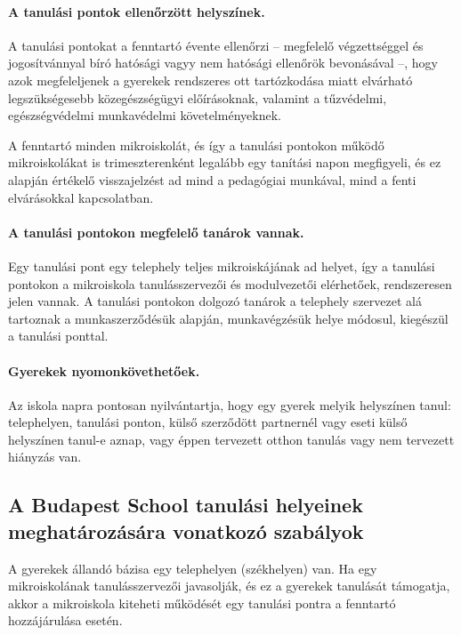 \paragraph{A tanulási pontok ellenőrzött helyszínek.}

A tanulási pontokat a fenntartó évente ellenőrzi -- megfelelő végzettséggel és jogosítvánnyal bíró hatósági vagyy nem hatósági ellenőrök bevonásával --, hogy azok megfeleljenek a gyerekek rendszeres ott tartózkodása miatt elvárható legszükségesebb közegészségügyi előírásoknak, valamint a tűzvédelmi, egészségvédelmi  munkavédelmi követelményeknek.

A fenntartó minden mikroiskolát, és így a tanulási pontokon működő mikroiskolákat is trimeszterenként legalább egy tanítási napon megfigyeli, és ez alapján értékelő visszajelzést ad mind a pedagógiai munkával, mind a fenti elvárásokkal kapcsolatban.

\paragraph{A tanulási pontokon megfelelő tanárok vannak.}

Egy tanulási pont egy telephely teljes mikroiskájának ad helyet, így a tanulási pontokon a mikroiskola tanulásszervezői és modulvezetői elérhetőek, rendszeresen jelen vannak. A tanulási pontokon dolgozó tanárok a telephely szervezet alá tartoznak a munkaszerződésük alapján, munkavégzésük helye módosul, kiegészül a tanulási ponttal.

\paragraph{Gyerekek nyomonkövethetőek.}

Az iskola napra pontosan nyilvántartja, hogy egy gyerek melyik helyszínen tanul: telephelyen, tanulási ponton, külső szerződött partnernél vagy eseti külső helyszínen tanul-e aznap, vagy éppen tervezett otthon tanulás vagy nem tervezett hiányzás van.

\subsection{A Budapest School tanulási helyeinek meghatározására vonatkozó szabályok}
A gyerekek állandó bázisa egy telephelyen (székhelyen) van. Ha egy mikroiskolának tanulásszervezői javasolják, és ez a gyerekek tanulását támogatja, akkor a mikroiskola kiteheti működését egy tanulási pontra a fenntartó hozzájárulása esetén.

